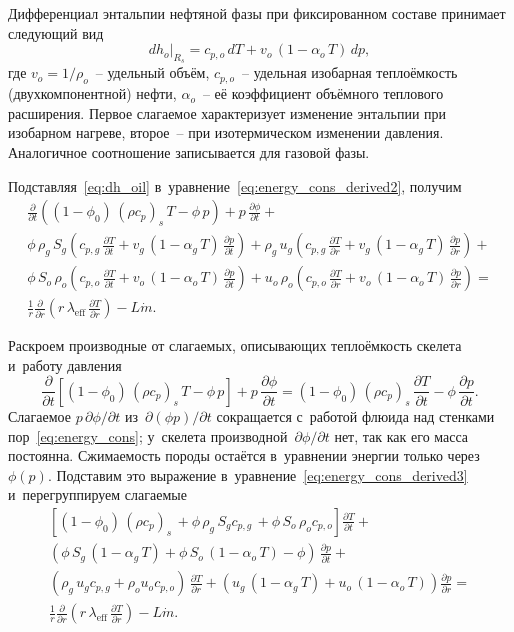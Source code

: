 \documentclass[12pt,a4paper]{article}
\newcommand{\divr}[1]{\frac{1}{r}\frac{\partial}{\partial r}\!\left(r\,#1\right)}
\newcommand{\pdt}[1]{\frac{\partial #1}{\partial t}}
\newcommand{\pdr}[1]{\frac{\partial #1}{\partial r}}
\newcommand{\mdot}{\dot{m}}
\newcommand{\leff}{\lambda_{\mathrm{eff}}}
\begin{document}
Дифференциал энтальпии нефтяной фазы при фиксированном
составе принимает следующий вид
\begin{equation}\label{eq:dh_oil}
  dh_o\big|_{R_s} = c_{p,o}\,dT + v_o\,(1 - \alpha_o\,T)\,dp,
\end{equation}
где $v_o = 1/\rho_o$~-- удельный объём,
$c_{p,o}$~-- удельная изобарная теплоёмкость (двухкомпонентной) нефти,
$\alpha_o$~-- её коэффициент объёмного теплового расширения.
Первое слагаемое характеризует изменение энтальпии при изобарном нагреве,
второе~-- при изотермическом изменении давления. Аналогичное соотношение записывается
для газовой фазы.

Подставляя~\eqref{eq:dh_oil} в~уравнение~\eqref{eq:energy_cons_derived2}, получим
\begin{multline}\label{eq:energy_cons_derived3}
  \pdt{}\left( (1 - \phi_0)\,(\rho c_p)_s\,T - \phi\,p\right) + p\,\pdt{\phi}
      +
      \\
    \phi\,\rho_g\,S_g
    \left(c_{p,g}\,\pdt{T} + v_g\,(1 - \alpha_g\,T)\,\pdt{p}\right)\!
    + \rho_g\,u_g\left(c_{p,g}\,\pdr{T} + v_g\,(1 - \alpha_g\,T)\,\pdr{p}\right)  +
    \\
    \phi\,S_o\,\rho_o
    \left(c_{p,o}\,\pdt{T} + v_o\,(1 - \alpha_o\,T)\,\pdt{p}\right)
    +
      u_o\,\rho_o\left(c_{p,o}\,\pdr{T} + v_o\,(1 - \alpha_o\,T)\,\pdr{p}\right) =
  \\
  \divr{\leff\,\pdr{T}} - L\mdot.
\end{multline}

Раскроем производные от слагаемых, описывающих теплоёмкость скелета
и~работу давления
\begin{equation}\label{eq:rock_dt}
  \pdt{}\!\left[
    (1-\phi_0)\,(\rho c_p)_s\,T-\phi\,p
  \right] + p\,\pdt{\phi}
  = (1-\phi_0)\,(\rho c_p)_s\,\pdt{T}
    - \phi\,\pdt{p}.
\end{equation}
Слагаемое $p\,\partial\phi/\partial t$ из~$\partial(\phi p)/\partial t$
сокращается с~работой флюида над стенками пор~\eqref{eq:energy_cons};
у~скелета производной~$\partial\phi/\partial t$ нет, так как его масса
постоянна. Сжимаемость породы остаётся в~уравнении энергии только
через~$\phi(p)$.
Подставим это выражение в~уравнение~\eqref{eq:energy_cons_derived3}
и~перегруппируем слагаемые
\begin{multline}\label{eq:energy_cons_derived4}
  \left[(1-\phi_0)\,(\rho c_p)_s\, +\phi\,\rho_g\,S_gc_{p,g}\,  +\phi\,S_o\,\rho_oc_{p,o}\right]\pdt{T}
    +
    \\
    (\phi\,S_g\,(1 - \alpha_g\,T)+\phi\,S_o\,(1 - \alpha_o\,T)-\phi)\,\pdt{p}
      +
      \\
    (\rho_g\,u_gc_{p,g}+\rho_ou_oc_{p,o})\,\pdr{T} + (u_g\,(1 - \alpha_g\,T)+ u_o\,(1 - \alpha_o\,T))\pdr{p} =
  \\
  \divr{\leff\,\pdr{T}} - L\mdot.
\end{multline}
\end{document}
